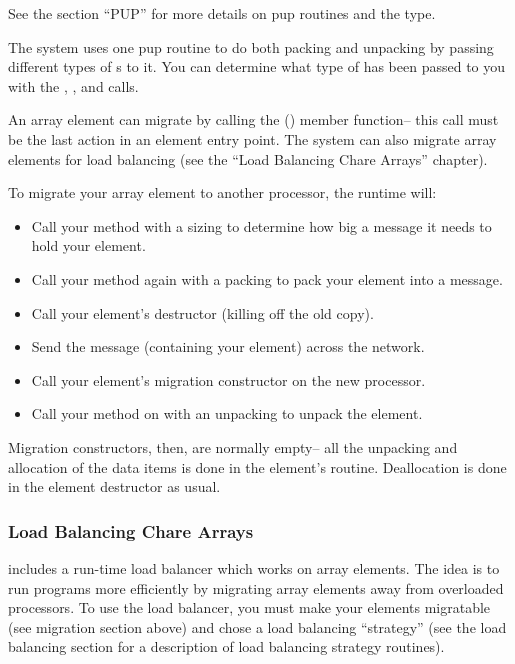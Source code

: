 See the  section ``PUP'' for more details on pup routines
and the  type.

The system uses one pup routine to do both packing and unpacking by
passing different types of s to it.  You can determine
what type of  has been passed to you with the
, , and  calls.

An array element can migrate by calling the () member function-- this call must be the last action
in an element entry point.  The system can also migrate array elements
for load balancing (see the ``Load Balancing Chare Arrays'' chapter).

To migrate your array element to another processor, the \charmpp{}
runtime will:

\begin{itemize}
\item Call your  method with a sizing  to determine how 
big a message it needs to hold your element.
\item Call your  method again with a packing  to pack 
your element into a message.
\item Call your element's destructor (killing off the old copy).
\item Send the message (containing your element) across the network.
\item Call your element's migration constructor on the new processor.
\item Call your  method on with an unpacking  to unpack 
the element.
\end{itemize}

Migration constructors, then, are normally empty-- all the unpacking
and allocation of the data items is done in the element's  routine.
Deallocation is done in the element destructor as usual.


\subsubsection{Load Balancing Chare Arrays}
\charmpp{} includes a run-time load balancer which works
on array elements.  The idea is to run programs more efficiently
by migrating array elements away from overloaded processors.
To use the load balancer, you must make your elements migratable
(see migration section above) and chose a load balancing 
``strategy'' (see the load balancing section for a description
of load balancing strategy routines).

